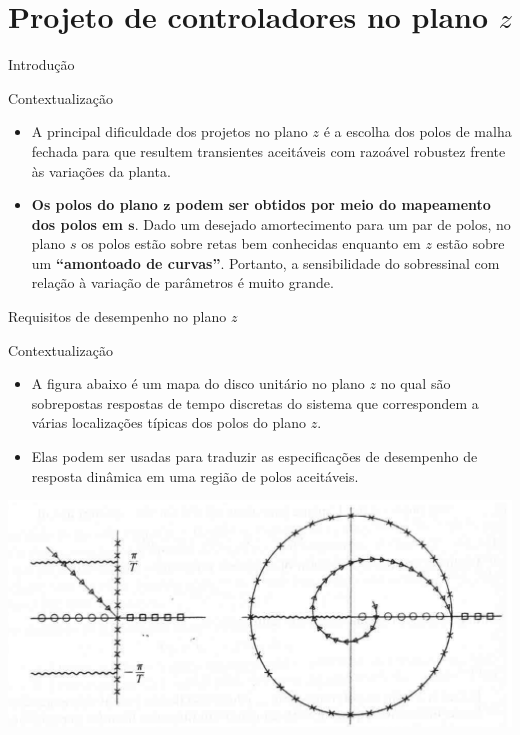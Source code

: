 \section{Projeto de controladores no \texorpdfstring{plano $ z $}{plano-z}}

\begin{frame}{Introdução}
\begin{block}{Contextualização}
	\begin{itemize}
		\item A principal dificuldade dos projetos no plano $ z $ é a escolha dos polos de malha fechada para que resultem transientes aceitáveis com razoável robustez frente às variações da planta.
		\item \textbf{Os polos do plano $ \bm{z} $ podem ser obtidos por meio do mapeamento dos polos em $ \bm{s} $}.	Dado um desejado amortecimento para um par de polos, no plano $ s $ os polos estão sobre retas bem conhecidas enquanto em $ z $ estão sobre um \textbf{“amontoado de curvas”}. Portanto, a sensibilidade do sobressinal com relação à variação de parâmetros é muito grande.
	\end{itemize}
\end{block}
\end{frame}

\begin{frame}{Requisitos de desempenho no plano $z$}
\begin{block}{Contextualização}
	\begin{itemize}
		\item A figura abaixo é um mapa do disco unitário no plano $z$ no qual são sobrepostas respostas de tempo discretas do sistema que correspondem a várias localizações típicas dos polos do plano $z$.
		\item Elas podem ser usadas para traduzir as especificações de desempenho de resposta dinâmica em uma região de polos aceitáveis.
	\end{itemize}
\end{block}
\centerline{\includegraphics[width=0.8\linewidth]{Figuras/Ch11/fig1.PNG}}
\end{frame}

